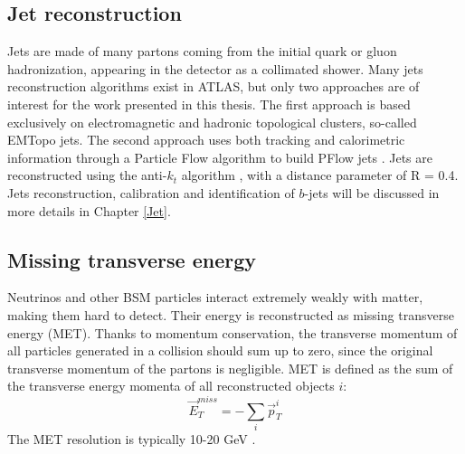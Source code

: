 \subsection{Jet reconstruction}
\label{chap2:Objects:Jet}
Jets are made of many partons coming from the initial quark or gluon hadronization, appearing in the detector as a collimated shower. Many jets reconstruction algorithms exist in ATLAS, but only two approaches are of interest for the work presented in this thesis. The first approach is based exclusively on electromagnetic and hadronic topological clusters, so-called EMTopo jets. The second approach uses both tracking and calorimetric information through a Particle Flow algorithm to build PFlow jets \cite{Jet_Perf_Run2}. Jets are reconstructed using the anti-$k_t$ algorithm \cite{Anti-Kt}, with a distance parameter of R = 0.4. Jets reconstruction, calibration and identification of $b$-jets will be discussed in more details in Chapter \ref{Jet}. 

\subsection{Missing transverse energy}
\label{chap2:Objects:MET}
Neutrinos and other BSM particles interact extremely weakly with matter, making them hard to detect. Their energy is reconstructed as missing transverse energy (MET). Thanks to momentum conservation, the transverse momentum of all particles generated in a collision should sum up to zero, since the original transverse momentum of the partons is negligible. MET is defined as the sum of the transverse energy momenta of all reconstructed objects $i$: 
\begin{equation}
    \vec{E}_{T}^{m i s s}=-\sum_{i} \vec{p}_{T}^{i}
\end{equation}
The MET resolution is typically 10-20 GeV \cite{MET_reso}.